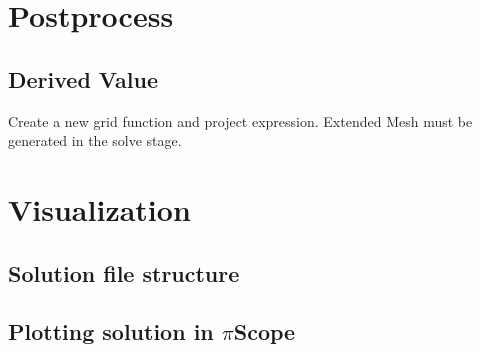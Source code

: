 \documentclass[11pt,a4paper,draft]{report}
\begin{document}
\chapter{Postprocess}
        
\section{Derived Value}     
Create a new grid function and project expression.
Extended Mesh must be generated in the solve stage.

\chapter{Visualization}
\section{Solution file structure}
\section{Plotting solution in $\pi$Scope}
\end{document}
